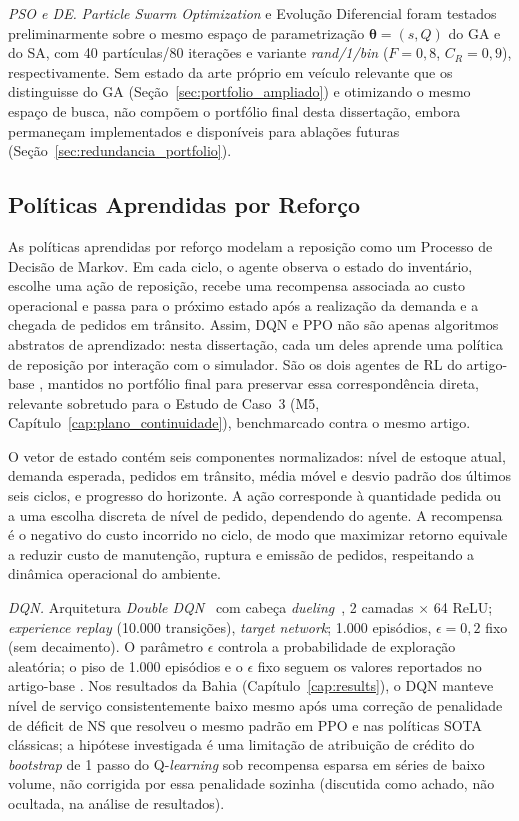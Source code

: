 \textit{PSO e DE.} \textit{Particle Swarm Optimization} e Evolução Diferencial foram testados preliminarmente sobre o mesmo espaço de parametrização $\boldsymbol{\theta}=(s,Q)$ do GA e do SA, com 40 partículas/80 iterações e variante \textit{rand/1/bin} ($F=0{,}8$, $C_R=0{,}9$), respectivamente. Sem estado da arte próprio em veículo relevante que os distinguisse do GA (Seção~\ref{sec:portfolio_ampliado}) e otimizando o mesmo espaço de busca, não compõem o portfólio final desta dissertação, embora permaneçam implementados e disponíveis para ablações futuras (Seção~\ref{sec:redundancia_portfolio}).

\subsection{Políticas Aprendidas por Reforço}

As políticas aprendidas por reforço modelam a reposição como um Processo de Decisão de Markov. Em cada ciclo, o agente observa o estado do inventário, escolhe uma ação de reposição, recebe uma recompensa associada ao custo operacional e passa para o próximo estado após a realização da demanda e a chegada de pedidos em trânsito. Assim, DQN e PPO não são apenas algoritmos abstratos de aprendizado: nesta dissertação, cada um deles aprende uma política de reposição por interação com o simulador. São os dois agentes de RL do artigo-base \citep{Zabraoui2025GaDQN}, mantidos no portfólio final para preservar essa correspondência direta, relevante sobretudo para o Estudo de Caso~3 (M5, Capítulo~\ref{cap:plano_continuidade}), benchmarcado contra o mesmo artigo.

O vetor de estado contém seis componentes normalizados: nível de estoque atual, demanda esperada, pedidos em trânsito, média móvel e desvio padrão dos últimos seis ciclos, e progresso do horizonte. A ação corresponde à quantidade pedida ou a uma escolha discreta de nível de pedido, dependendo do agente. A recompensa é o negativo do custo incorrido no ciclo, de modo que maximizar retorno equivale a reduzir custo de manutenção, ruptura e emissão de pedidos, respeitando a dinâmica operacional do ambiente.

\textit{DQN.} Arquitetura \textit{Double DQN}~\citep{VanHasselt2016DoubleDQN} com cabeça \textit{dueling}~\citep{Wang2016DuelingDQN}, 2 camadas $\times$ 64 ReLU; \textit{experience replay} (10.000 transições), \textit{target network}; 1.000 episódios, $\epsilon=0{,}2$ fixo (sem decaimento). O parâmetro $\epsilon$ controla a probabilidade de exploração aleatória; o piso de 1.000 episódios e o $\epsilon$ fixo seguem os valores reportados no artigo-base \citep{Zabraoui2025GaDQN}. Nos resultados da Bahia (Capítulo~\ref{cap:results}), o DQN manteve nível de serviço consistentemente baixo mesmo após uma correção de penalidade de déficit de NS que resolveu o mesmo padrão em PPO e nas políticas SOTA clássicas; a hipótese investigada é uma limitação de atribuição de crédito do \textit{bootstrap} de 1 passo do Q-\textit{learning} sob recompensa esparsa em séries de baixo volume, não corrigida por essa penalidade sozinha (discutida como achado, não ocultada, na análise de resultados).

